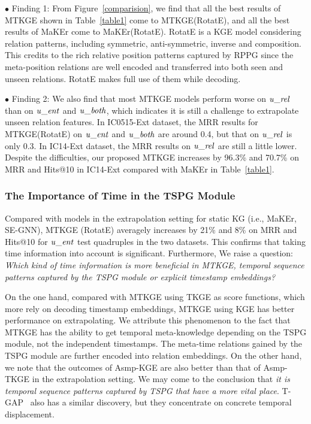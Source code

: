 \documentclass[sigconf]{acmart}
\begin{document}
$\bullet$ Finding 1: From Figure~\ref{comparision}, we find that all the best results of MTKGE shown in Table~\ref{table1} come to MTKGE(RotatE), and all the best results of MaKEr come to MaKEr(RotatE). 
RotatE is a KGE model considering relation patterns, including symmetric, anti-symmetric, inverse and composition. This credits to the rich relative position patterns captured by RPPG since the meta-position relations are well encoded and transferred into both seen and unseen relations. RotatE makes full use of them while decoding.
\par
$\bullet$ Finding 2: We also find that most MTKGE models perform worse on $\text {\emph{u}\_\emph{rel}}$ than on $\text {\emph{u}\_\emph{ent}}$ and $\text {\emph{u}\_\emph{both}}$, which indicates it is still a challenge to extrapolate unseen relation features. 
In IC0515-Ext dataset, the MRR results for MTKGE(RotatE) on $\text {\emph{u}\_\emph{ent}}$ and $\text {\emph{u}\_\emph{both}}$ are around 0.4, but that on $\text {\emph{u}\_\emph{rel}}$ is only 0.3. 
In IC14-Ext dataset, the MRR results on $\text {\emph{u}\_\emph{rel}}$ are still a little lower. 
Despite the difficulties, our proposed MTKGE increases by 96.3\% and 70.7\% on MRR and Hits@10 in IC14-Ext compared with MaKEr in Table~\ref{table1}. 



\subsubsection{\textbf{The Importance of Time in the TSPG Module}}

Compared with models in the extrapolation setting for static KG (i.e., MaKEr, SE-GNN), MTKGE (RotatE) averagely increases by 21\% and 8\% on MRR and Hits@10 for $\text {\emph{u}\_\emph{ent}}$ test quadruples in the two datasets. This confirms that taking time information into account is significant. Furthermore, We raise a question: \emph{Which kind of time information is more beneficial in MTKGE, temporal sequence patterns captured by the TSPG module or explicit timestamp embeddings?}
\par
On the one hand, compared with MTKGE using TKGE as score functions, which more rely on decoding timestamp embeddings, MTKGE using KGE has better performance on extrapolating.
We attribute this phenomenon to the fact that MTKGE has the ability to get temporal meta-knowledge depending on the TSPG module, not the independent timestamps. The meta-time relations gained by the TSPG module are further encoded into relation embeddings. 
On the other hand, we note that the outcomes of Asmp-KGE are also better than that of Asmp-TKGE in the extrapolation setting. We may come to the conclusion that \emph{it is temporal sequence patterns captured by TSPG that have a more vital place}. T-GAP~\citep{TGAP} also has a similar discovery, but they concentrate on concrete temporal displacement.
\end{document}
